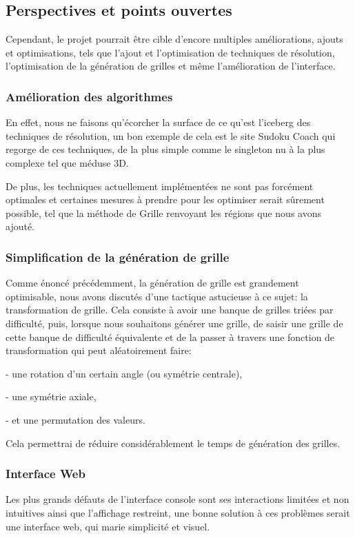 \documentclass[a4paper]{article}
\begin{document}
\subsection{Perspectives et points ouvertes}
Cependant, le projet pourrait être cible d'encore multiples améliorations, ajouts et optimisations, tels que l'ajout et l'optimisation de techniques de résolution, l'optimisation de la génération de grilles et même l'amélioration de l'interface.

\subsubsection{Amélioration des algorithmes}
En effet, nous ne faisons qu'écorcher la surface de ce qu'est l'iceberg des techniques de résolution, un bon exemple de cela est le site Sudoku Coach \textbf{\cite{sudokucoach}} qui regorge de ces techniques, de la plus simple comme le singleton nu à la plus complexe tel que méduse 3D. 

De plus, les techniques actuellement implémentées ne sont pas forcément optimales et certaines mesures à prendre pour les optimiser serait sûrement possible, tel que la méthode de Grille renvoyant les régions que nous avons ajouté.

\subsubsection{Simplification de la génération de grille}
Comme énoncé précédemment, la génération de grille est grandement optimisable, nous avons discutés d'une tactique astucieuse à ce sujet: la transformation de grille. Cela consiste à avoir une banque de grilles triées par difficulté, puis, lorsque nous souhaitons générer une grille, de saisir une grille de cette banque de difficulté équivalente et de la passer à travers une fonction de transformation qui peut aléatoirement faire:
	
- une rotation d'un certain angle (ou symétrie centrale),

- une symétrie axiale,

- et une permutation des valeurs.

Cela permettrai de réduire considérablement le temps de génération des grilles.

\subsubsection{Interface Web}
Les plus grands défauts de l'interface console sont ses interactions limitées et non intuitives ainsi que l'affichage restreint, une bonne solution à ces problèmes serait une interface web, qui marie simplicité et visuel. 
\end{document}
